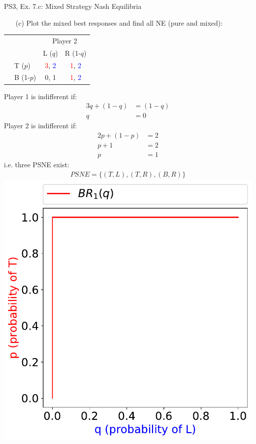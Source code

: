 \begin{frame}{PS3, Ex. 7.c: Mixed Strategy Nash Equilibria}
  \begin{multicols}{2}
    \begin{itemize}
      \item[(c)] Plot the mixed best responses and find all NE (pure and mixed):
    \end{itemize}
    \begin{table}
      \begin{tabular}{cl|c|c|}
        & \multicolumn{1}{c}{} & \multicolumn{2}{c}{\color{blue}Player 2}\\
        \parbox[t]{1mm}{}
        &  &  &  \\
        & T  ($p$)  & \textcolor{red}{3}, \textcolor{blue}{2} & \textcolor{red}{1}, \textcolor{blue}{2} \\
        & B  (1-$p$)& 0, 1 & \textcolor{red}{1}, \textcolor{blue}{2} \\
      \end{tabular}
    \end{table}
    Player 1 is indifferent if:
    \begin{align*}
      3q+(1-q) &= (1-q) \\
      q &= 0
    \end{align*}
    Player 2 is indifferent if:
    \begin{align*}
      2p + (1-p) &= 2 \\
      p + 1      &= 2 \\
      p          &= 1
    \end{align*}
    i.e. three PSNE exist:
    \begin{align*}
      PSNE=\{(T,L),(T,R),(B,R)\}
    \end{align*}
  \vfill\null \columnbreak
    \includegraphics[width=\columnwidth]{figures/5c1}

\end{multicols}
\end{frame}
